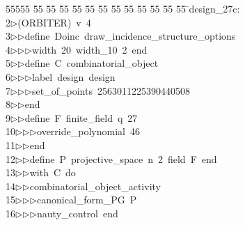 %
%
\begin{tabbing}
55555 \= 55 \= 55 \= 55 \= 55 \= 55 \= 55 \= 55 \= 55 \= 55 \= 55 \= 55 \= 55 \= \>design\_27c:\\[0pt]
2\>$\triangleright$\>(ORBITER)\ v\ 4\ \\[0pt]
3\>$\triangleright$\>$\triangleright$\>define\ Doinc\ draw\_incidence\_structure\_options\ \\[0pt]
4\>$\triangleright$\>$\triangleright$\>$\triangleright$\>width\ 20\ width\_10\ 2\ end\ \\[0pt]
5\>$\triangleright$\>$\triangleright$\>define\ C\ combinatorial\_object\ \\[0pt]
6\>$\triangleright$\>$\triangleright$\>$\triangleright$\>label\ design\ design\ \\[0pt]
7\>$\triangleright$\>$\triangleright$\>$\triangleright$\>set\_of\_points\ 2563011225390440508\ \\[0pt]
8\>$\triangleright$\>$\triangleright$\>end\ \\[0pt]
9\>$\triangleright$\>$\triangleright$\>define\ F\ finite\_field\ q\ 27\ \\[0pt]
10\>$\triangleright$\>$\triangleright$\>$\triangleright$\>override\_polynomial\ 46\ \\[0pt]
11\>$\triangleright$\>$\triangleright$\>end\ \\[0pt]
12\>$\triangleright$\>$\triangleright$\>define\ P\ projective\_space\ n\ 2\ field\ F\ end\ \\[0pt]
13\>$\triangleright$\>$\triangleright$\>with\ C\ do\ \\[0pt]
14\>$\triangleright$\>$\triangleright$\>combinatorial\_object\_activity\ \\[0pt]
15\>$\triangleright$\>$\triangleright$\>$\triangleright$\>canonical\_form\_PG\ P\ \\[0pt]
16\>$\triangleright$\>$\triangleright$\>$\triangleright$\>nauty\_control\ end\ \\[0pt]

\end{tabbing}
